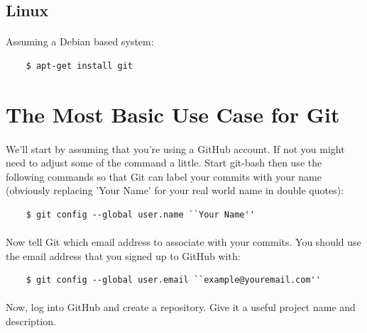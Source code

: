 \documentclass[10pt, a4paper, twosize]{article}
\begin{document}
\subsection{Linux}
\paragraph{} Assuming a Debian based system:

\begin{lstlisting}
    $ apt-get install git
\end{lstlisting}


\section{The Most Basic Use Case for Git}

\paragraph{} We'll start by assuming that you're using a GitHub account. If not you might need to adjust some of the command a little. Start git-bash then use the following commands so that Git can label your commits with your name (obviously replacing 'Your Name' for your real world name in double quotes):

\begin{lstlisting}
    $ git config --global user.name ``Your Name''
\end{lstlisting}

\paragraph{} Now tell Git which email address to associate with your commits. You should use the email address that you signed up to GitHub with:

\begin{lstlisting}
    $ git config --global user.email ``example@youremail.com''
\end{lstlisting}

\paragraph{} Now, log into GitHub and create a repository. Give it a useful project name and description. 
\end{document}
